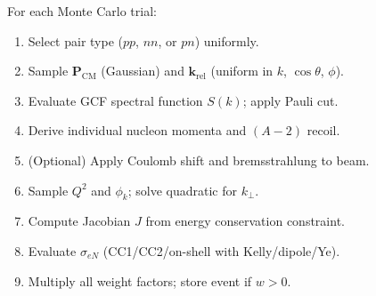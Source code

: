 \documentclass[11pt,a4paper]{article}
\newcommand{\vect}[1]{\bm{#1}}
\begin{document}
For each Monte Carlo trial:
\begin{enumerate}
  \item Select pair type ($pp$, $nn$, or $pn$) uniformly.
  \item Sample $\vect{P}_{\text{CM}}$ (Gaussian) and $\vect{k}_{\text{rel}}$
        (uniform in $k$, $\cos\theta$, $\phi$).
  \item Evaluate GCF spectral function $S(k)$; apply Pauli cut.
  \item Derive individual nucleon momenta and $(A{-}2)$ recoil.
  \item (Optional) Apply Coulomb shift and bremsstrahlung to beam.
  \item Sample $Q^{2}$ and $\phi_{k}$; solve quadratic for $k_{\perp}$.
  \item Compute Jacobian $J$ from energy conservation constraint.
  \item Evaluate $\sigma_{eN}$ (CC1/CC2/on-shell with Kelly/dipole/Ye).
  \item Multiply all weight factors; store event if $w > 0$.
\end{enumerate}
\end{document}

